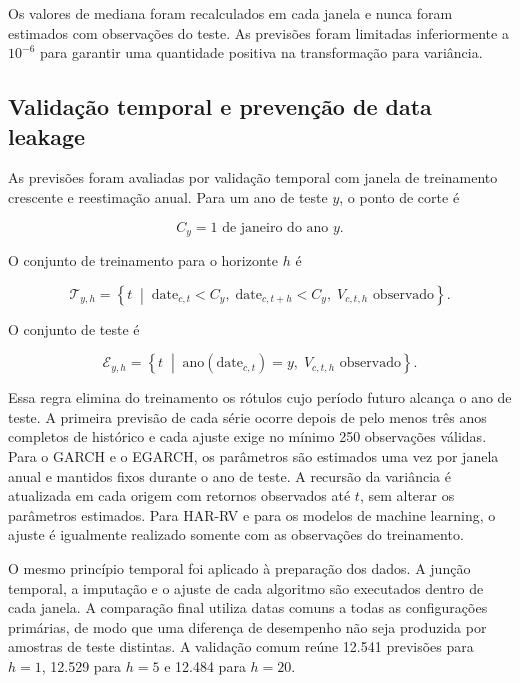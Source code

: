 \documentclass[a4paper,fleqn]{cas-sc}
\begin{document}
Os valores de mediana foram recalculados em cada janela e nunca foram estimados com observações do teste. As previsões foram limitadas inferiormente a \(10^{-6}\) para garantir uma quantidade positiva na transformação para variância.

\subsection{Validação temporal e prevenção de data leakage}
\label{subsec:temporal_validation}

As previsões foram avaliadas por validação temporal com janela de treinamento crescente e reestimação anual. Para um ano de teste \(y\), o ponto de corte é

\begin{equation}
C_y=\text{1 de janeiro do ano }y.
\label{eq:cutoff}
\end{equation}

O conjunto de treinamento para o horizonte \(h\) é

\begin{equation}
\mathcal{T}_{y,h}
=
\left\{
t
\;\middle|\;
\text{date}_{c,t}<C_y,\;
\text{date}_{c,t+h}<C_y,\;
V_{c,t,h}\text{ observado}
\right\}.
\label{eq:train_set}
\end{equation}

O conjunto de teste é

\begin{equation}
\mathcal{E}_{y,h}
=
\left\{
t
\;\middle|\;
\text{ano}(\text{date}_{c,t})=y,\;
V_{c,t,h}\text{ observado}
\right\}.
\label{eq:test_set}
\end{equation}

Essa regra elimina do treinamento os rótulos cujo período futuro alcança o ano de teste. A primeira previsão de cada série ocorre depois de pelo menos três anos completos de histórico e cada ajuste exige no mínimo 250 observações válidas. Para o GARCH e o EGARCH, os parâmetros são estimados uma vez por janela anual e mantidos fixos durante o ano de teste. A recursão da variância é atualizada em cada origem com retornos observados até \(t\), sem alterar os parâmetros estimados. Para HAR-RV e para os modelos de machine learning, o ajuste é igualmente realizado somente com as observações do treinamento.

O mesmo princípio temporal foi aplicado à preparação dos dados. A junção temporal, a imputação e o ajuste de cada algoritmo são executados dentro de cada janela. A comparação final utiliza datas comuns a todas as configurações primárias, de modo que uma diferença de desempenho não seja produzida por amostras de teste distintas. A validação comum reúne 12.541 previsões para \(h=1\), 12.529 para \(h=5\) e 12.484 para \(h=20\).
\end{document}
